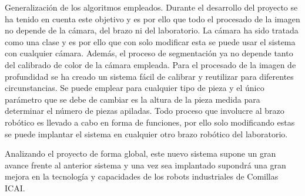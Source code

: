 Generalización de los algoritmos empleados. Durante el desarrollo del proyecto se ha tenido en cuenta este objetivo y es por ello que todo el procesado de la imagen no depende de la cámara, del brazo ni del laboratorio. La cámara ha sido tratada como una clase y es por ello que con solo modificar esta se puede usar el sistema con cualquier cámara. Además, el proceso de segmentación ya no depende tanto del calibrado de color de la cámara empleada. Para el procesado de la imagen de profundidad se ha creado un sistema fácil de calibrar y reutilizar para diferentes circunstancias. Se puede emplear para cualquier tipo de pieza y el único parámetro que se debe de cambiar es la altura de la pieza medida para determinar el número de piezas apiladas. Todo proceso que involucre al brazo robótico es llevado a cabo en forma de funciones, por ello solo modificando estas se puede implantar el sistema en cualquier otro brazo robótico del laboratorio.

Analizando el proyecto de forma global, este nuevo sistema supone un gran avance frente al anterior sistema y una vez sea implantado supondrá una gran mejora en la tecnología y capacidades de los robots industriales de Comillas ICAI.